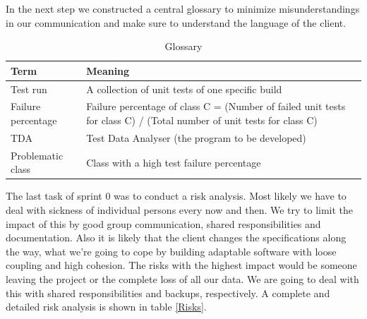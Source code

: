 In the next step we constructed a central glossary to minimize misunderstandings in our communication and make sure to understand the language of the client. \\ 

\begin{table}[h]
  \caption{Glossary}
  \label{Glossary}
  \centering
  \begin{tabular}{p{2.3cm}||p{10cm}|}
  	Term & Meaning \\ 
  	\hline
  	\hline
  	Test run & A collection of unit tests of one specific build \\ 
  	\hline
  	Failure percentage & Failure percentage of class C = (Number of failed unit tests for class C) / (Total number of unit tests for class C) \\ 
  	\hline
  	TDA & Test Data Analyser (the program to be developed) \\ 
  	\hline
  	Problematic class & Class with a high test failure percentage \\ 
  	\hline
  \end{tabular}
\end{table}

The last task of sprint 0 was to conduct a risk analysis. Most likely we have to deal with sickness of individual persons every now and then. We try to limit the impact of this by good group communication, shared responsibilities and documentation. Also it is likely that the client changes the specifications along the way, what we’re going to cope by building adaptable software with loose coupling and high cohesion. The risks with the highest impact would be someone leaving the project or the complete loss of all our data. We are going to deal with this with shared responsibilities and backups, respectively. A complete and detailed risk analysis is shown in table \ref{Risks}. \\ 

